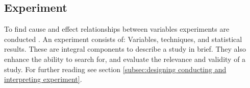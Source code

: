 
\subsection{Experiment}
\label{subsec:experiment}

To find cause and effect relationships between variables experiments are conducted \cite{BuddiesVariables}. An experiment consists of: Variables, techniques, and statistical results. These are integral components to describe a study in brief. They also enhance the ability to search for, and evaluate the relevance and validity of a study. For further reading see section \ref{subsec:designing conducting and interpreting experiment}.